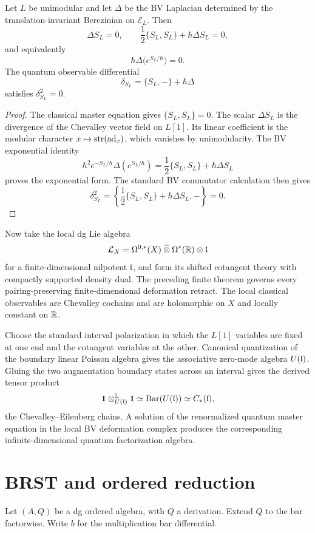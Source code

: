 \begin{theorem}
Let $L$ be unimodular and let $\Delta$ be the BV Laplacian determined by the translation-invariant Berezinian on $\mathcal E_L$. Then
\[
 \Delta S_L=0,
 \qquad
 \frac12\{S_L,S_L\}+\hbar\Delta S_L=0,
\]
and equivalently
\[
 \hbar\Delta\bigl(e^{S_L/\hbar}\bigr)=0.
\]
The quantum observable differential
\[
 \delta_{S_L}=\{S_L,-\}+\hbar\Delta
\]
satisfies $\delta_{S_L}^2=0$.
\end{theorem}
\begin{proof}
The classical master equation gives $\{S_L,S_L\}=0$. The scalar $\Delta S_L$ is the divergence of the Chevalley vector field on $L[1]$. Its linear coefficient is the modular character $x\mapsto\operatorname{str}(\operatorname{ad}_x)$, which vanishes by unimodularity. The BV exponential identity
\[
 \hbar^2e^{-S_L/\hbar}\Delta(e^{S_L/\hbar})
 =\frac12\{S_L,S_L\}+\hbar\Delta S_L
\]
proves the exponential form. The standard BV commutator calculation then gives
\[
 \delta_{S_L}^2=\left\{\frac12\{S_L,S_L\}+\hbar\Delta S_L,-\right\}=0.
\]
\end{proof}

Now take the local dg Lie algebra
\[
 \mathcal L_X=\Omega^{0,*}(X)\mathbin{\widehat\otimes}\Omega^*(\mathbb R)\otimes\mathfrak l
\]
for a finite-dimensional nilpotent $\mathfrak l$, and form its shifted cotangent theory with compactly supported density dual. The preceding finite theorem governs every pairing-preserving finite-dimensional deformation retract. The local classical observables are Chevalley cochains and are holomorphic on $X$ and locally constant on $\mathbb R$.

Choose the standard interval polarization in which the $L[1]$ variables are fixed at one end and the cotangent variables at the other. Canonical quantization of the boundary linear Poisson algebra gives the associative zero-mode algebra $U(\mathfrak l)$. Gluing the two augmentation boundary states across an interval gives the derived tensor product
\[
 \mathbf{1}\otimes_{U(\mathfrak l)}^{\mathbb L}\mathbf{1}
 \simeq\operatorname{Bar}(U(\mathfrak l))
 \simeq C_*(\mathfrak l),
\]
the Chevalley--Eilenberg chains. A solution of the renormalized quantum master equation in the local BV deformation complex produces the corresponding infinite-dimensional quantum factorization algebra.

\chapter{BRST and ordered reduction}
Let $(A,Q)$ be a dg ordered algebra, with $Q$ a derivation. Extend $Q$ to the bar factorwise. Write $b$ for the multiplication bar differential.

